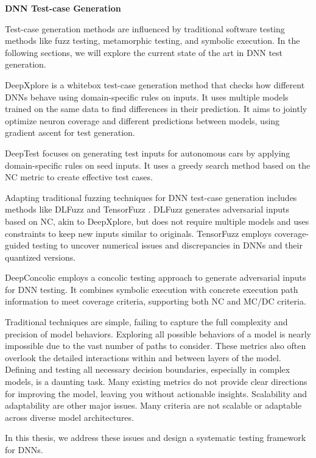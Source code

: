 \smallskip\noindent%
\textbf{DNN Test-case Generation}

Test-case generation methods are influenced by traditional software testing methods like fuzz testing, metamorphic testing, and symbolic execution. In the following sections, we will explore the current state of the art in DNN test generation.

DeepXplore \cite{deepxplore} is a whitebox test-case generation method that checks how different DNNs behave using domain-specific rules on inputs. It uses multiple models trained on the same data to find differences in their prediction. It aims to jointly optimize neuron coverage and different predictions between models, using gradient ascent for test generation.

DeepTest \cite{deeptest} focuses on generating test inputs for autonomous cars by applying domain-specific rules on seed inputs. It uses a greedy search method based on the NC metric to create effective test cases.

Adapting traditional fuzzing techniques for DNN test-case generation includes methods like DLFuzz \cite{dlfuzz} and TensorFuzz \cite{tensorfuzz}. DLFuzz generates adversarial inputs based on NC, akin to DeepXplore, but does not require multiple models and uses constraints to keep new inputs similar to originals. TensorFuzz employs coverage-guided testing to uncover numerical issues and discrepancies in DNNs and their quantized versions.

DeepConcolic \cite{deepconcolic} employs a concolic testing approach to generate adversarial inputs for DNN testing. It combines symbolic execution with concrete execution path information to meet coverage criteria, supporting both NC and MC/DC criteria.

Traditional techniques are simple, failing to capture the full complexity and precision of model behaviors. Exploring all possible behaviors of a model is nearly impossible due to the vast number of paths to consider. These metrics also often overlook the detailed interactions within and between layers of the model. Defining and testing all necessary decision boundaries, especially in complex models, is a daunting task. Many existing metrics do not provide clear directions for improving the model, leaving you without actionable insights. Scalability and adaptability are other major issues. Many criteria are not scalable or adaptable across diverse model architectures.

In this thesis, we address these issues and design a systematic testing framework for DNNs.

